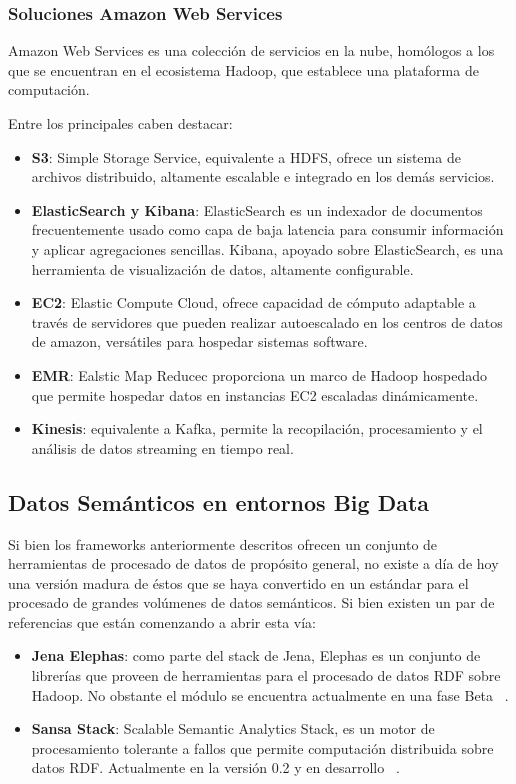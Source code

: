 \subsubsection{Soluciones Amazon Web Services}
\label{sec:eco-aws}

Amazon Web Services es una colección de servicios en la nube, homólogos a los
que se encuentran en el ecosistema Hadoop, que establece una plataforma de
computación.

Entre los principales caben destacar:

\begin{itemize}
\item \textbf{S3}: Simple Storage Service, equivalente a \acs{HDFS}, ofrece un sistema de archivos
  distribuido, altamente escalable e integrado en los demás servicios. 
\item \textbf{ElasticSearch y Kibana}: ElasticSearch es un indexador de documentos frecuentemente
  usado como capa de baja latencia para consumir información y aplicar
  agregaciones sencillas. Kibana, apoyado sobre ElasticSearch, es una
  herramienta de visualización de datos, altamente configurable. 
\item \textbf{EC2}: Elastic Compute Cloud, ofrece capacidad de cómputo adaptable
  a través de servidores que pueden realizar autoescalado en los centros de
  datos de amazon, versátiles para hospedar sistemas software. 
\item \textbf{EMR}: Ealstic Map Reducec proporciona un marco de Hadoop hospedado que permite
  hospedar datos en instancias EC2 escaladas dinámicamente. 
\item \textbf{Kinesis}: equivalente a Kafka, permite la recopilación,
  procesamiento y el análisis de datos streaming en tiempo real. 
\end{itemize}


\subsection{Datos Semánticos en entornos Big Data}

Si bien los frameworks anteriormente descritos ofrecen un conjunto de
herramientas de procesado de datos de propósito general, no existe a día de hoy
una versión madura de éstos que se haya convertido en un estándar para el
procesado de grandes volúmenes de datos semánticos. Si bien existen un par de
referencias que están comenzando a abrir esta vía: 

\begin{itemize}
\item \textbf{Jena Elephas}: como parte del stack de Jena, Elephas es un
  conjunto de librerías que proveen de herramientas para el procesado de datos
  RDF sobre Hadoop. No obstante el módulo se encuentra actualmente en una fase
  Beta ~\cite{JENE:jena-elephas}. 
\item \textbf{Sansa Stack}: Scalable Semantic Analytics Stack, es un motor de
  procesamiento tolerante a fallos que permite computación distribuida sobre
  datos RDF. Actualmente en la versión 0.2 y en desarrollo ~\cite{SANSA-stack}.
\end{itemize}


